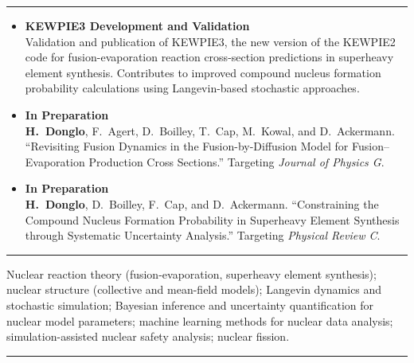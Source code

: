 \documentclass[10pt,a4paper]{article}
\newcommand{\cvsection}[1]{%
  \par\vspace{8pt}%
  \noindent{\large\bfseries\textcolor{maincolor}{#1}}\par
  {\color{maincolor}\rule{\linewidth}{0.6pt}}%
  \vspace{4pt}%
}
\newcommand{\cvsubsection}[1]{%
  \par\vspace{4pt}%
  \noindent{\normalsize\bfseries\textcolor{maincolor}{#1}}%
  \vspace{2pt}%
}
\begin{document}
\cvsection{Ongoing Research Projects}

{\footnotesize
\begin{itemize}[leftmargin=1.4em, itemsep=6pt, topsep=2pt,
                label=\textbullet]

  \item \textbf{KEWPIE3 Development and Validation}\\
  Validation and publication of KEWPIE3, the new version of the KEWPIE2 code
  for fusion-evaporation reaction cross-section predictions in superheavy
  element synthesis. Contributes to improved compound nucleus formation
  probability calculations using Langevin-based stochastic approaches.

  \item \textbf{In Preparation}\\
  \textbf{H.\ Donglo}, F.\ Agert, D.\ Boilley, T.\ Cap, M.\ Kowal, and D.\ Ackermann.
  ``Revisiting Fusion Dynamics in the Fusion-by-Diffusion Model for
  Fusion--Evaporation Production Cross Sections.''
  Targeting \textit{Journal of Physics G}.

  \item \textbf{In Preparation}\\
  \textbf{H.\ Donglo}, D.\ Boilley, F.\ Cap, and D.\ Ackermann.
  ``Constraining the Compound Nucleus Formation Probability in
  Superheavy Element Synthesis through Systematic Uncertainty
  Analysis.'' Targeting \textit{Physical Review C}.

\end{itemize}
}

\cvsection{Research Interests}

{\footnotesize
Nuclear reaction theory (fusion-evaporation, superheavy element
synthesis); nuclear structure (collective and mean-field models);
Langevin dynamics and stochastic simulation; Bayesian inference and
uncertainty quantification for nuclear model parameters; machine
learning methods for nuclear data analysis; simulation-assisted
nuclear safety analysis; nuclear fission.
}

\cvsection{Teaching and Supervision}

\cvsubsection{Teaching Experience}
\end{document}
